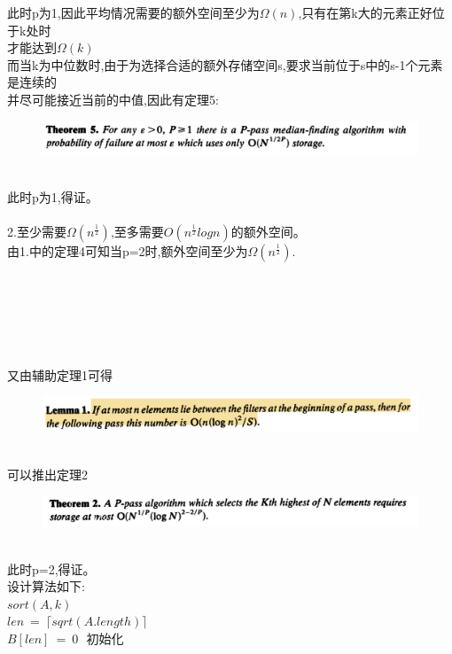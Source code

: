 \documentclass[19pt,a4paper]{article}
\begin{document}
\indent 此时p为1,因此平均情况需要的额外空间至少为$\Omega(n)$,只有在第k大的元素正好位于k处时\\
\indent 才能达到$\Omega(k)$\\
\indent 而当k为中位数时,由于为选择合适的额外存储空间s,要求当前位于s中的s-1个元素是连续的\\
\indent 并尽可能接近当前的中值,因此有定理5:\\
\begin{figure}[htbp]
 \centering
 \includegraphics[scale=0.4]{3.png}
\end{figure}\\
\indent 此时p为1,得证。\\
\\
\indent 2.至少需要$\Omega(n^\frac{1}{2})$,至多需要$O(n^\frac{1}{2}logn)$的额外空间。\\
\indent 由1.中的定理4可知当p=2时,额外空间至少为$\Omega(n^\frac{1}{2})$.\\
\\
\\
\\
\\
\\
\\
\indent 又由辅助定理1可得\\
\begin{figure}[htbp]
 \centering
 \includegraphics[scale=0.4]{4.png}
\end{figure}\\
\indent 可以推出定理2\\
\begin{figure}[htbp]
 \centering
 \includegraphics[scale=0.4]{5.png}
\end{figure}\\
\indent 此时p=2,得证。\\
\indent 设计算法如下:\\
\indent $sort(A,k)$\\
\indent $len\ =\ \lceil sqrt(A.length)\rceil$\\
\indent $B[len]\ =\ {0}\ \ \ 初始化$\\
\end{document}

